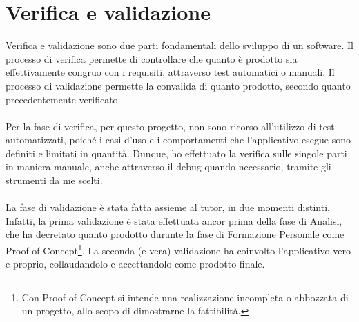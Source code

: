 \chapter{Verifica e validazione}
\label{cap:verifica-validazione}

Verifica e validazione sono due parti fondamentali dello sviluppo di un software.
Il processo di verifica permette di controllare che quanto è prodotto sia effettivamente congruo con i requisiti, attraverso test automatici o manuali.
Il processo di validazione permette la convalida di quanto prodotto, secondo quanto precedentemente verificato.\\\\
Per la fase di verifica, per questo progetto, non sono ricorso all'utilizzo di test automatizzati, poiché i casi d'uso e i comportamenti che l'applicativo esegue sono definiti e limitati in quantità.
Dunque, ho effettuato la verifica sulle singole parti in maniera manuale, anche attraverso il debug quando necessario, tramite gli strumenti da me scelti.\\\\
La fase di validazione è stata fatta assieme al tutor, in due momenti distinti.
Infatti, la prima validazione è stata effettuata ancor prima della fase di Analisi, che ha decretato quanto prodotto durante la fase di Formazione Personale come Proof of Concept\footnote{Con Proof of Concept si intende una realizzazione incompleta o abbozzata di un progetto, allo scopo di dimostrarne la fattibilità.}.
La seconda (e vera) validazione ha coinvolto l'applicativo vero e proprio, collaudandolo e accettandolo come prodotto finale.
